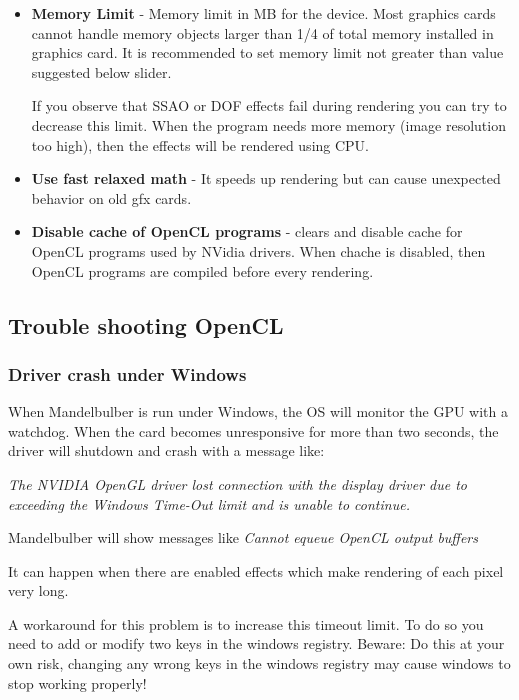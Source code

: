 \begin{itemize}
	\item \textbf{Memory Limit} - Memory limit in MB for the device. Most graphics cards cannot handle memory objects larger than 1/4 of total memory installed in graphics card. It is recommended to set memory limit not greater than value suggested below slider.  
	
	If you observe that SSAO or DOF effects fail during rendering you can try to decrease this limit. When the program needs more memory (image resolution too high), then the effects will be rendered using CPU.
	
	\item \textbf{Use fast relaxed math} - It speeds up rendering but can cause unexpected behavior on old gfx cards.
	 
	\item \textbf{Disable cache of OpenCL programs} - clears and disable cache for OpenCL programs used by NVidia drivers. When chache is disabled, then OpenCL programs are compiled before every rendering.
\end{itemize}


\subsection{Trouble shooting OpenCL}\label{opencl-troubleshooting}

\subsubsection{Driver crash under Windows}

When Mandelbulber is run under Windows, the OS will monitor the GPU with a watchdog. When the card becomes unresponsive for more than two seconds, the driver will shutdown and crash with a message like:

\emph{The NVIDIA OpenGL driver lost connection with the display driver due to exceeding the Windows Time-Out limit and is unable to continue.}

Mandelbulber will show messages like \emph{Cannot equeue OpenCL output buffers}

It can happen when there are enabled effects which make rendering of each pixel very long. 

A workaround for this problem is to increase this timeout limit. To do so you need to add or modify two keys in the windows registry. Beware: Do this at your own risk, changing any wrong keys in the windows registry may cause windows to stop working properly!


